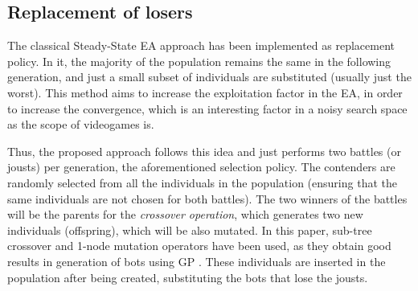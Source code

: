 \documentclass[conference]{IEEEtran}
\begin{document}

\subsection{Replacement of losers}
\label{subsec:replacement}



The classical Steady-State EA approach \cite{Genitor_whitley} has been implemented as replacement policy. In it, the majority of the population remains the same in the following generation, and just a small subset of individuals are substituted (usually just the worst). This method aims to increase the exploitation factor in the EA, in order to increase the convergence, which is an interesting factor in a noisy search space as the scope of videogames is.



Thus, the proposed approach follows this idea and just performs two battles (or jousts) per generation, the aforementioned selection policy. The contenders are randomly selected from all the individuals in the population (ensuring that the same individuals are not chosen for both battles).
The two winners of the battles will be the parents for the \textit{crossover operation}, which generates two new individuals (offspring), which will be also mutated.
In this paper, sub-tree crossover and 1-node mutation operators have been used, as they obtain good results in generation of bots using GP \cite{EsparciaGP2013}.
These individuals are inserted in the population after being created, substituting the bots that lose the jousts.
\end{document}
